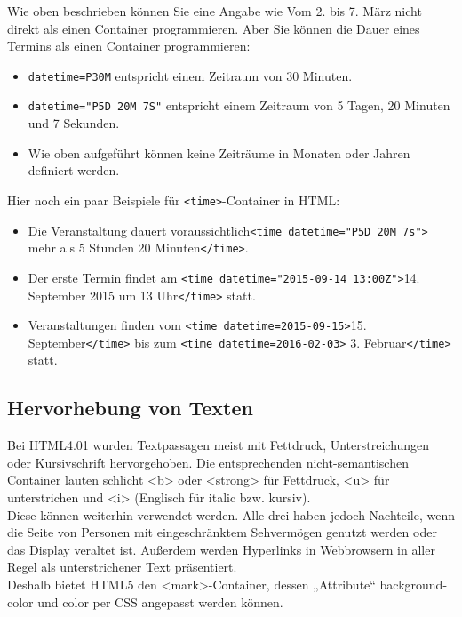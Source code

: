 Wie oben beschrieben können Sie eine Angabe wie \glqq{}Vom 2. bis 7. März\grqq{} nicht direkt als einen Container programmieren. Aber Sie können die Dauer eines Termins als einen Container programmieren:

\begin{itemize}
	\item \verb|datetime=P30M| entspricht einem Zeitraum von 30 Minuten.
	\item \verb|datetime="P5D 20M 7S"| entspricht einem Zeitraum von 5 Tagen, 20 Minuten und 7 Sekunden.
	\item Wie oben aufgeführt können keine Zeiträume in Monaten oder Jahren definiert werden.
\end{itemize}

Hier noch ein paar Beispiele für \verb|<time>|-Container in HTML:

\begin{itemize}
	\item Die Veranstaltung dauert voraussichtlich\verb|<time datetime="P5D 20M 7s">| mehr als 5 Stunden 20 Minuten\verb|</time>|.
	\item Der erste Termin findet am \verb|<time datetime="2015-09-14 13:00Z">|14. September 2015 um 13 Uhr\verb|</time>| statt.
	\item Veranstaltungen finden vom \verb|<time datetime=2015-09-15>|15. September\verb|</time>| bis zum \verb|<time datetime=2016-02-03>| 3. Februar\verb|</time>| statt.
\end{itemize}

\subsection{Hervorhebung von Texten}

Bei HTML4.01 wurden Textpassagen meist mit Fettdruck, Unterstreichungen oder Kursivschrift hervorgehoben. Die entsprechenden nicht-semantischen Container lauten schlicht <b> oder <strong> für Fettdruck, <u> für unterstrichen und <i> (Englisch für italic bzw. kursiv). \\

Diese können weiterhin verwendet werden. Alle drei haben jedoch Nachteile, wenn die Seite von Personen mit eingeschränktem Sehvermögen genutzt werden oder das Display veraltet ist. Außerdem werden Hyperlinks in Webbrowsern in aller Regel als unterstrichener Text präsentiert.\\

Deshalb bietet HTML5 den <mark>-Container, dessen „Attribute“ background-color und color per CSS angepasst werden können. \\

